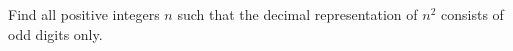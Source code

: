 Find all positive integers $n$ such that the decimal representation of $n^2$ consists of odd digits only.